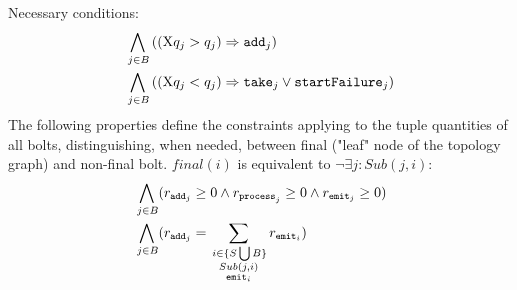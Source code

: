 %
Necessary conditions:
%
\begin{align*}
 \bigwedge_{
\begin{subarray}{c}
\,j \in B
\end{subarray}
} &\left( (\aX q_j > q_j) 
\Rightarrow 
\add{j}\right)\\
%
%
 \bigwedge_{
\begin{subarray}{c}
\,j \in B
\end{subarray}
} &\left( (\aX q_j < q_j) 
\Rightarrow 
\ta{j} \lor \startf{j} \right)
\end{align*}
%
The following properties define the constraints applying to the tuple quantities of all bolts, distinguishing, when needed, between final ("leaf" node of the topology graph) and non-final bolt. $\mathit{final}(i)$ is equivalent to $\lnot \exists j: Sub(j,i)$:
%
%
\begin{align*}
& \bigwedge_{
\begin{subarray}{c}
\,j \in B
\end{subarray}
} ( \ra{j} \geq 0 \land \rp{j} \geq 0 \land \re{j} \geq 0 ) \\
%
%
& \bigwedge_{
\begin{subarray}{c}
\,j \in B
\end{subarray}
} ( \ra{j} = \sum_{
\begin{subarray}{c}
\,i \in \{S \bigcup B \}\\
Sub(j,i) \\
\e{i}
\end{subarray}
 } \re{i})
%
%
\end{align*}
%
%
